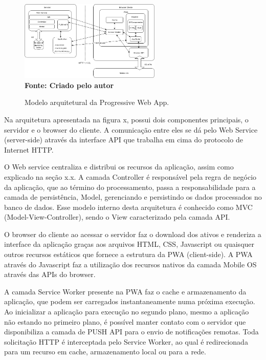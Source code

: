 \begin{figure}[ht]
	\centering	
	\caption[\hspace{0.1cm}]{Modelo arquitetural da Progressive Web App.}
	\vspace{-0.4cm}
	\includegraphics[width=0.6\textwidth]{figuras/arquitetura-pwa.png}
	 \vspace{-0.2cm}
	\\\textbf{\footnotesize Fonte: Criado pelo autor }
	\label{fig:casodeuso}
\end{figure}
\vspace{-0.5cm}

Na arquitetura apresentada na figura x, possui dois componentes principais, o servidor e o browser do cliente. A comunicação entre eles se dá pelo Web Service (server-side) através da interface API que trabalha em cima do protocolo de Internet HTTP.

O Web service centraliza e distribui os recursos da aplicação, assim como explicado na seção x.x. A camada Controller é responsável pela regra de negócio da aplicação, que ao término do processamento, passa a responsabilidade para a camada de persistência, Model, gerenciando e persistindo os dados processados no banco de dados. Esse modelo interno desta arquitetura é conhecido como MVC (Model-View-Controller), sendo o View caracterizado pela camada API.

O browser do cliente ao acessar o servidor faz o download dos ativos e renderiza a interface da aplicação graças aos arquivos HTML,  CSS, Javascript ou quaisquer outros recursos estáticos que fornece a estrutura da PWA (client-side). A PWA através do Javascript faz a utilização dos recursos nativos da camada Mobile OS através das APIs do browser.

A camada Service Worker presente na PWA faz o cache e armazenamento da aplicação, que podem ser carregados instantaneamente numa próxima execução. Ao inicializar a aplicação para execução no segundo plano, mesmo a aplicação não estando no primeiro plano, é possível manter contato com o servidor que disponibiliza a camada de PUSH API para o envio de notificações remotas. Toda solicitação HTTP é interceptada pelo Service Worker, ao qual é redirecionada para um recurso em cache, armazenamento local ou para a rede.

